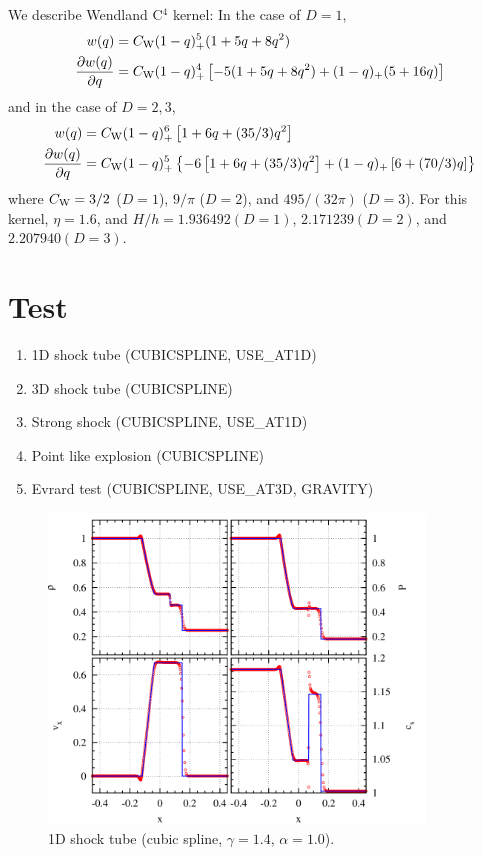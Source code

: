 \documentclass[fleqn,dvipdfmx]{article}
\begin{document}
We describe Wendland C$^4$ kernel: In the case of $D = 1$,
\begin{align}
  w(q) &= C_{\rm W} (1-q)_+^5 (1+5q+8q^2) \\
  \frac{\partial w(q)}{\partial q} &= C_{\rm W} (1-q)_+^4 \left[
    -5(1+5q+8q^2) + (1-q)_+ (5+16q) \right]
\end{align}
and in the case of $D = 2, 3$,
\begin{align}
  w(q) &= C_{\rm W} (1-q)_+^6 \left[ 1+6q+(35/3)q^2 \right] \\
  \frac{\partial w(q)}{\partial q} &= C_{\rm W} (1-q)_+^5 \left\{-6
  \left[ 1+6q+(35/3)q^2 \right] + (1-q)_+ \left[ 6+(70/3)q \right]
  \right\}
\end{align}
where $C_{\rm W}=3/2$ ($D=1$), $9/\pi$ ($D=2$), and $495/(32\pi)$
($D=3$). For this kernel, $\eta=1.6$, and $H/h=1.936492(D=1)$,
$2.171239(D=2)$, and $2.207940(D=3)$.

\section{Test}

\begin{enumerate}
\item 1D shock tube (CUBICSPLINE, USE_AT1D)
\item 3D shock tube (CUBICSPLINE)
\item Strong shock (CUBICSPLINE, USE_AT1D)
\item Point like explosion (CUBICSPLINE)
\item Evrard test (CUBICSPLINE, USE_AT3D, GRAVITY)
\end{enumerate}

\begin{figure}
  \begin{center}
    \includegraphics[width=10cm,bb=0 0 1020 840]{fig/shock_1d/draw.png}
  \end{center}
  \caption{1D shock tube (cubic spline, $\gamma=1.4$, $\alpha=1.0$).}
\end{figure}
\end{document}
